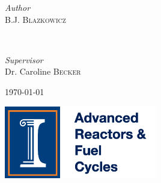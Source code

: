 \begin{titlepage}
	\begin{minipage}{0.4\textwidth}
		\begin{flushleft}
			\large
			\textit{Author}\\
			B.J. \textsc{Blazkowicz} %
		\end{flushleft}
	\end{minipage}
	~
	\begin{minipage}{0.4\textwidth}
		\begin{flushright}
			\large
			\textit{Supervisor}\\
			Dr. Caroline \textsc{Becker} %
		\end{flushright}
	\end{minipage}
	
	
	
	\vfill\vfill\vfill %
	
	{\large\today} %
	
	
	\vfill\vfill
	\includegraphics[width=0.5\textwidth]{logo.png} %
	 
	
	\vfill %
	
\end{titlepage}




